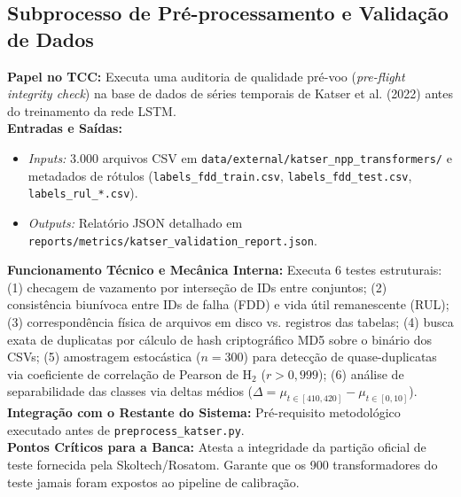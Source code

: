 \documentclass[10pt,a4paper]{article}
\begin{document}
\subsection{Subprocesso de Pré-processamento e Validação de Dados}

\begin{filebox}
\textbf{Papel no TCC:} Executa uma auditoria de qualidade pré-voo (\textit{pre-flight integrity check}) na base de dados de séries temporais de Katser et al. (2022) antes do treinamento da rede LSTM.\\
\textbf{Entradas e Saídas:}
\begin{itemize}[leftmargin=*,itemsep=1pt]
  \item \textit{Inputs:} 3.000 arquivos CSV em \texttt{data/external/katser\_npp\_transformers/} e metadados de rótulos (\texttt{labels\_fdd\_train.csv}, \texttt{labels\_fdd\_test.csv}, \texttt{labels\_rul\_*.csv}).
  \item \textit{Outputs:} Relatório JSON detalhado em \texttt{reports/metrics/katser\_validation\_report.json}.
\end{itemize}
\textbf{Funcionamento Técnico e Mecânica Interna:} Executa 6 testes estruturais: (1) checagem de vazamento por interseção de IDs entre conjuntos; (2) consistência biunívoca entre IDs de falha (FDD) e vida útil remanescente (RUL); (3) correspondência física de arquivos em disco vs. registros das tabelas; (4) busca exata de duplicatas por cálculo de hash criptográfico MD5 sobre o binário dos CSVs; (5) amostragem estocástica ($n=300$) para detecção de quase-duplicatas via coeficiente de correlação de Pearson de $\text{H}_2$ ($r > 0,999$); (6) análise de separabilidade das classes via deltas médios ($\Delta = \mu_{t \in [410, 420]} - \mu_{t \in [0, 10]}$).\\
\textbf{Integração com o Restante do Sistema:} Pré-requisito metodológico executado antes de \texttt{preprocess\_katser.py}.\\
\textbf{Pontos Críticos para a Banca:} Atesta a integridade da partição oficial de teste fornecida pela Skoltech/Rosatom. Garante que os 900 transformadores do teste jamais foram expostos ao pipeline de calibração.
\end{filebox}
\end{document}
